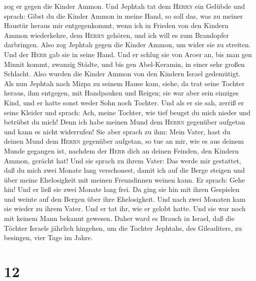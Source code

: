 zog er gegen die Kinder Ammon.  Und Jephtah tat dem
\textsc{Herrn} ein Gelübde und sprach: Gibst du die Kinder Ammon in
meine Hand,  so soll das, was zu meiner Haustür heraus
mir entgegenkommt, wenn ich in Frieden von den Kindern Ammon
wiederkehre, dem \textsc{Herrn} gehören, und ich will es zum Brandopfer
darbringen.  Also zog Jephtah gegen die Kinder Ammon, um
wider sie zu streiten. Und der \textsc{Herr} gab sie in seine Hand.
 Und er schlug sie von Aroer an, bis man gen Minnit
kommt, zwanzig Städte, und bis gen Abel-Keramin, in einer sehr großen
Schlacht. Also wurden die Kinder Ammon von den Kindern Israel
gedemütigt.  Als nun Jephtah nach Mizpa zu seinem Hause
kam, siehe, da trat seine Tochter heraus, ihm entgegen, mit Handpauken
und Reigen; sie war aber sein einziges Kind, und er hatte sonst weder
Sohn noch Tochter.  Und als er sie sah, zerriß er seine
Kleider und sprach: Ach, meine Tochter, wie tief beugst du mich nieder
und betrübst du mich! Denn ich habe meinen Mund dem \textsc{Herrn}
gegenüber aufgetan und kann es nicht widerrufen!  Sie
aber sprach zu ihm: Mein Vater, hast du deinen Mund dem \textsc{Herrn}
gegenüber aufgetan, so tue an mir, wie es aus deinem Munde gegangen ist,
nachdem der \textsc{Herr} dich an deinen Feinden, den Kindern Ammon,
gerächt hat!  Und sie sprach zu ihrem Vater: Das werde
mir gestattet, daß du mich zwei Monate lang verschonest, damit ich auf
die Berge steigen und über meine Ehelosigkeit mit meinen Freundinnen
weinen kann.  Er sprach: Gehe hin! Und er ließ sie zwei
Monate lang frei. Da ging sie hin mit ihren Gespielen und weinte auf den
Bergen über ihre Ehelosigkeit.  Und nach zwei Monaten kam
sie wieder zu ihrem Vater. Und er tat ihr, wie er gelobt hatte. Und sie
war noch mit keinem Mann bekannt gewesen.  Daher ward es
Brauch in Israel, daß die Töchter Israels jährlich hingehen, um die
Tochter Jephtahs, des Gileaditers, zu besingen, vier Tage im Jahre.

\hypertarget{section-11}{%
\section{12}\label{section-11}}

